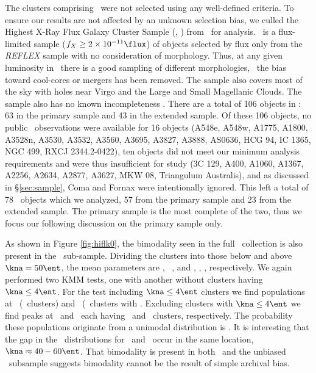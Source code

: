 \documentclass{emulateapj}
\begin{document}
The clusters comprising \accept\ were not selected using any
well-defined criteria. To ensure our results are not affected by an
unknown selection bias, we culled the Highest X-Ray Flux Galaxy
Cluster Sample (\hifl, \citealt{hiflugcs1, hiflugcs2}) from \accept\
for analysis. \hifl\ is a flux-limited sample ($f_X \ge 2 \times
10^{-11} \flux$) of objects selected by flux only from the
{\it{REFLEX}} sample \citep{reflex} with no consideration of
morphology. Thus, at any given luminosity in \hifl\ there is a good
sampling of different morphologies, \ie\ the bias toward cool-cores or
mergers has been removed. The sample also covers most of the sky with
holes near Virgo and the Large and Small Magellanic Clouds. The sample
also has no known incompleteness \citep{2007A&A...466..805C}. There
are a total of 106 objects in \hifl: 63 in the primary sample and 43
in the extended sample. Of these 106 objects, no public \chandra\
observations were available for 16 objects (A548e, A548w, A1775,
A1800, A3528n, A3530, A3532, A3560, A3695, A3827, A3888, AS0636, HCG
94, IC 1365, NGC 499, RXCJ 2344.2-0422), ten objects did not meet our
minimum analysis requirements and were thus insufficient for study (3C
129, A400, A1060, A1367, A2256, A2634, A2877, A3627, MKW 08,
Triangulum Australis), and as discussed in \S\ref{sec:sample}, Coma
and Fornax were intentionally ignored. This left a total of 78 \hifl\
objects which we analyzed, 57 from the primary sample and 23 from the
extended sample. The primary sample is the most complete of the two,
thus we focus our following discussion on the primary sample only.

As shown in Figure \ref{fig:hiflk0}, the bimodality seen in the full
\accept\ collection is also present in the \hifl\ sub-sample. Dividing
the clusters into those below and above $\kna = 50 \ent$, the mean
parameters are \hifla, \hiflb\, \hiflc, and \hifld, \hifle, \hiflf,
respectively.
We again performed two KMM tests, one with %
another without %
clusters having $\kna \le 4 \ent$. For the test including $\kna \le 4
\ent$ clusters we find populations at \hiflkmma\ (\hiflkmmc\ clusters)
and \hiflkmmb\ (\hiflkmmd\ clusters with \hiflkmme. Excluding clusters
with $\kna \le 4 \ent$ we find peaks at \hiflkmmf\ and \hiflkmmg\ each
having \hiflkmmh\ and \hiflkmmi\ clusters, respectively. The
probability these populations originate from a unimodal distribution
is \hiflkmmj. It is interesting that the gap in the
\kna\ distributions for \accept\ and \hifl\ occur in the same location,
$\kna \approx 40-60 \ent$. That bimodality is present in both \accept\
and the unbiased \hifl\ subsample suggests bimodality cannot be the
result of simple archival bias.
\end{document}
